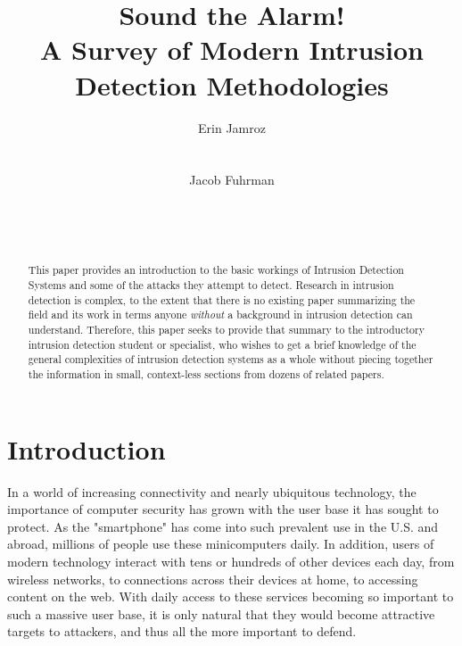 \documentclass{acm_proc_article-sp}
\begin{document}
\title{Sound the Alarm!\\A Survey of Modern Intrusion Detection Methodologies} 

\author{
\alignauthor
Erin Jamroz
       \\
       \\
       \\
\alignauthor
Jacob Fuhrman
       \\
       \\
       \\
       \\       
}

\maketitle

\begin{abstract}
	This paper provides an introduction to the basic workings of Intrusion Detection Systems and some of the attacks they attempt to detect. Research in intrusion detection is complex, to the extent that there is no existing paper summarizing the field and its work in terms anyone \emph{without} a background in intrusion detection can understand. Therefore, this paper seeks to provide that summary to the introductory intrusion detection student or specialist, who wishes to get a brief knowledge of the general complexities of intrusion detection systems as a whole without piecing together the information in small, context-less sections from dozens of related papers.
\end{abstract}

\section{Introduction}
	In a world of increasing connectivity and nearly ubiquitous technology, the importance of computer security has grown with the user base it has sought to protect. As the "smartphone" has come into such prevalent use in the U.S. and abroad, millions of people use these minicomputers daily. In addition, users of modern technology interact with tens or hundreds of other devices each day, from wireless networks, to connections across their devices at home, to accessing content on the web. With daily access to these services becoming so important to such a massive user base, it is only natural that they would become attractive targets to attackers, and thus all the more important to defend. 
	
\end{document}
